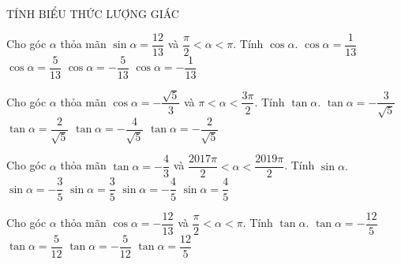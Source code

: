 \begin{dang}
    {TÍNH BIỂU THỨC LƯỢNG GIÁC}
\end{dang}

\begin{ex}%
Cho góc $\alpha $ thỏa mãn $\sin \alpha =\dfrac{{12}}{{13}}$ và $\dfrac{\pi}{2}<\alpha <\pi $. Tính $\cos \alpha.$
\choice
{$\cos \alpha =\dfrac{1}{{13}}$}
{$\cos \alpha =\dfrac{5}{{13}}$}
{$\cos \alpha =-\dfrac{5}{{13}}$}
{\True $\cos \alpha =-\dfrac{1}{{13}}$}
\end{ex}

\begin{ex}%
Cho góc $\alpha $ thỏa mãn $\cos \alpha =-\dfrac{{\sqrt{5}}}{3}$ và $\pi <\alpha <\dfrac{{3\pi}}{2}$. Tính $\tan \alpha.$
\choice
{$\tan \alpha =-\dfrac{3}{{\sqrt{5}}}$}
{\True $\tan \alpha =\dfrac{2}{{\sqrt{5}}}$}
{$\tan \alpha =-\dfrac{4}{{\sqrt{5}}}$}
{$\tan \alpha =-\dfrac{2}{{\sqrt{5}}}$}
\end{ex}

\begin{ex}%
Cho góc $\alpha $ thỏa mãn $\tan \alpha =-\dfrac{4}{3}$ và $\dfrac{{2017\pi}}{2}<\alpha <\dfrac{{2019\pi}}{2}$. Tính $\sin \alpha.$
\choice
{$\sin \alpha =-\dfrac{3}{5}$}
{$\sin \alpha =\dfrac{3}{5}$}
{$\sin \alpha =-\dfrac{4}{5}$}
{\True $\sin \alpha =\dfrac{4}{5}$}
\end{ex}

\begin{ex}%
Cho góc $\alpha $ thỏa mãn $\cos \alpha =-\dfrac{{12}}{{13}}$ và $\dfrac{\pi}{2}<\alpha <\pi.$ Tính $\tan \alpha.$
\choice
{$\tan \alpha =-\dfrac{{12}}{5}$}
{$\tan \alpha =\dfrac{5}{{12}}$}
{\True $\tan \alpha =-\dfrac{5}{{12}}$}
{$\tan \alpha =\dfrac{{12}}{5}$}
\end{ex}

